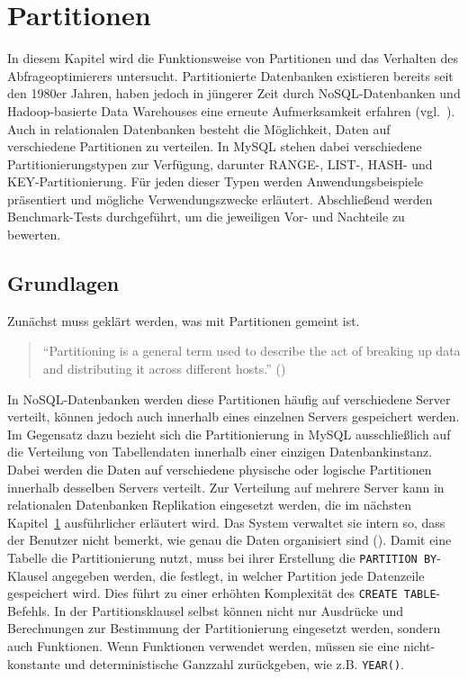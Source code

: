 
\chapter{Partitionen}\label{ch:partitions}

In diesem Kapitel wird die Funktionsweise von Partitionen und das Verhalten des Abfrageoptimierers untersucht.
Partitionierte Datenbanken existieren bereits seit den 1980er Jahren, haben jedoch in jüngerer Zeit durch NoSQL-Datenbanken und Hadoop-basierte Data Warehouses eine erneute Aufmerksamkeit erfahren (vgl.\ \cite[S. 200]{kleppmann2017designing}).
Auch in relationalen Datenbanken besteht die Möglichkeit, Daten auf verschiedene Partitionen zu verteilen.
In MySQL stehen dabei verschiedene Partitionierungstypen zur Verfügung, darunter RANGE-, LIST-, HASH- und KEY-Partitionierung.
Für jeden dieser Typen werden Anwendungsbeispiele präsentiert und mögliche Verwendungszwecke erläutert.
Abschließend werden Benchmark-Tests durchgeführt, um die jeweiligen Vor- und Nachteile zu bewerten.


\section{Grundlagen}\label{sec:partition-grundlagen}

Zunächst muss geklärt werden, was mit Partitionen gemeint ist.

\begin{quote}
	\enquote{Partitioning is a general term used to describe the act of breaking up data and distributing it across different hosts.} (\cite[S. 148]{da2015redis})
\end{quote}

In NoSQL-Datenbanken werden diese Partitionen häufig auf verschiedene Server verteilt, können jedoch auch innerhalb eines einzelnen Servers gespeichert werden.
Im Gegensatz dazu bezieht sich die Partitionierung in MySQL ausschließlich auf die Verteilung von Tabellendaten innerhalb einer einzigen Datenbankinstanz.
Dabei werden die Daten auf verschiedene physische oder logische Partitionen innerhalb desselben Servers verteilt.
Zur Verteilung auf mehrere Server kann in relationalen Datenbanken Replikation eingesetzt werden, die im nächsten Kapitel~\ref{ch:partitions} ausführlicher erläutert wird.
Das System verwaltet sie intern so, dass der Benutzer nicht bemerkt, wie genau die Daten organisiert sind (\cite[S. 265--273]{schwartz2012high}).
Damit eine Tabelle die Partitionierung nutzt, muss bei ihrer Erstellung die \texttt{PARTITION BY}-Klausel angegeben werden, die festlegt, in welcher Partition jede Datenzeile gespeichert wird.
Dies führt zu einer erhöhten Komplexität des \texttt{CREATE TABLE}-Befehls.
In der Partitionsklausel selbst können nicht nur Ausdrücke und Berechnungen zur Bestimmung der Partitionierung eingesetzt werden, sondern auch Funktionen.
Wenn Funktionen verwendet werden, müssen sie eine nicht-konstante und deterministische Ganzzahl zurückgeben, wie z.B. \texttt{YEAR()}.

